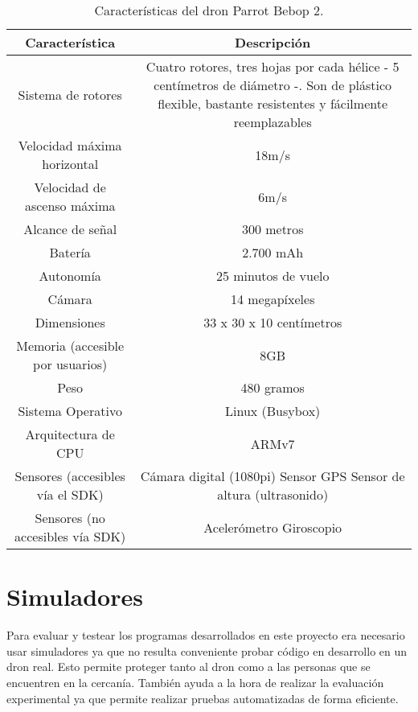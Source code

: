 \begin{table}[h!]
	\centering
	\caption{Características del dron Parrot Bebop 2.}
	\label{tab:comp}
	\begin{tabular}{|c|c|}
		\hline
		Característica & Descripción\\
		\hline
		Sistema de rotores & Cuatro rotores, tres hojas por cada hélice - 5 centímetros de diámetro -. Son de plástico flexible, bastante resistentes y fácilmente reemplazables \\
		Velocidad máxima horizontal & 18m/s \\
		Velocidad de ascenso máxima & 6m/s \\
		Alcance de señal & 300 metros \\
		Batería & 2.700 mAh \\
		Autonomía & 25 minutos de vuelo \\
		Cámara & 14 megapíxeles \\
		Dimensiones & 33 x 30 x 10 centímetros \\
		Memoria (accesible por usuarios) & 8GB \\
		Peso & 480 gramos \\
		Sistema Operativo & Linux (Busybox) \\
		Arquitectura de CPU & ARMv7 \\
		Sensores (accesibles vía el SDK) & Cámara digital (1080pi)
		Sensor GPS
		Sensor de altura (ultrasonido) \\
		Sensores (no accesibles vía SDK) & Acelerómetro
		Giroscopio \\
		\hline
	\end{tabular}
\end{table}




\section {Simuladores}
Para evaluar y testear los programas desarrollados en este proyecto era necesario usar simuladores ya que no resulta conveniente probar código en desarrollo en un dron real. Esto permite proteger tanto al dron como a las personas que se encuentren en la cercanía. También ayuda a la hora de realizar la evaluación experimental ya que permite realizar pruebas automatizadas de forma eficiente. 

